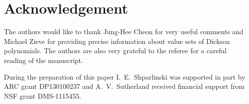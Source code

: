 \documentclass[12pt]{amsart}
\begin{document}



\section*{Acknowledgement}

The authors would like to thank Jung-Hee Cheon
for very useful comments and Michael Zieve for providing
precise 
information about value sets of Dickson polynomials. 
The authors are also very grateful to the referee 
for a careful reading of the manuscript. 

During the preparation of this paper  I.~E.~Shparlinski was supported in part
by ARC grant DP130100237 and
A.~V.~Sutherland received financial support from NSF grant DMS-1115455.
\end{document}
